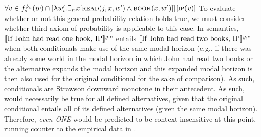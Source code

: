 $\forall v\in f^{\phi_n}_\sigma(w)\cap [\lambda w'_s.\exists_n{x}[\predicate{read}(j,x,w')\land\predicate{book}(x,w')]]\hspace{0.5mm}[\predicate{ip}(v)]$
\xe
To evaluate whether or not this general probability relation holds true, we must consider whether  third axiom of probability is applicable to this case. In  semantics, $\intension[g,c]{If John had read one book, IP}$ entails $\intension[g,c]{If John had read two books, IP}$ when both conditionals make use of the same modal horizon (e.g., if there was already some world in the modal horizon in which John had read two books or the alternative expands the modal horizon and this expanded modal horizon is then also used for the original conditional for the sake of comparison). As such,  conditionals are Strawson downward monotone in their antecedent. As such,  would necessarily be true for all defined alternatives, given that the original conditional entails all of its defined alternatives (given the same modal horizon). Therefore, \textit{even \MakeUppercase{one}} would be predicted to be context-insensitive at this point, running counter to the empirical data in . 

